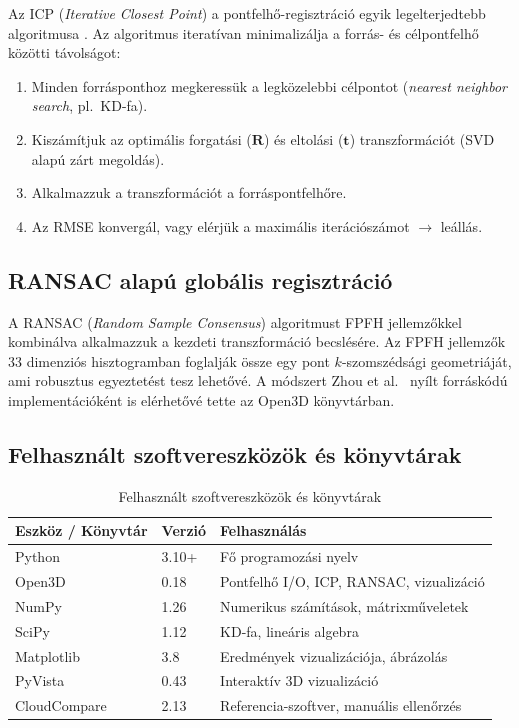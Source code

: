 \documentclass[12pt,a4paper]{article}
\begin{document}
Az ICP (\textit{Iterative Closest Point}) a pontfelhő-regisztráció egyik legelterjedtebb algoritmusa \cite{besl1992}. Az algoritmus iteratívan minimalizálja a forrás- és célpontfelhő közötti távolságot:

\begin{enumerate}
  \item Minden forrásponthoz megkeressük a legközelebbi célpontot (\textit{nearest neighbor search}, pl.\ KD-fa).
  \item Kiszámítjuk az optimális forgatási ($\mathbf{R}$) és eltolási ($\mathbf{t}$) transzformációt (SVD alapú zárt megoldás).
  \item Alkalmazzuk a transzformációt a forráspontfelhőre.
  \item Az RMSE konvergál, vagy elérjük a maximális iterációszámot $\rightarrow$ leállás.
\end{enumerate}

\subsection{RANSAC alapú globális regisztráció}

A RANSAC (\textit{Random Sample Consensus}) algoritmust FPFH jellemzőkkel kombinálva alkalmazzuk a kezdeti transzformáció becslésére. Az FPFH jellemzők 33 dimenziós hisztogramban foglalják össze egy pont $k$-szomszédsági geometriáját, ami robusztus egyeztetést tesz lehetővé. A módszert Zhou et al.\ \cite{zhou2016} nyílt forráskódú implementációként is elérhetővé tette az Open3D könyvtárban.

\subsection{Felhasznált szoftvereszközök és könyvtárak}

\begin{table}[h!]
\centering
\begin{tabular}{L{3.5cm} C{2cm} L{6.5cm}}
\toprule
\textbf{Eszköz / Könyvtár} & \textbf{Verzió} & \textbf{Felhasználás} \\
\midrule
Python        & 3.10+  & Fő programozási nyelv \\
Open3D        & 0.18   & Pontfelhő I/O, ICP, RANSAC, vizualizáció \\
NumPy         & 1.26   & Numerikus számítások, mátrixműveletek \\
SciPy         & 1.12   & KD-fa, lineáris algebra \\
Matplotlib    & 3.8    & Eredmények vizualizációja, ábrázolás \\
PyVista       & 0.43   & Interaktív 3D vizualizáció \\
CloudCompare  & 2.13   & Referencia-szoftver, manuális ellenőrzés \\
\bottomrule
\end{tabular}
\caption{Felhasznált szoftvereszközök és könyvtárak}
\end{table}
\end{document}
